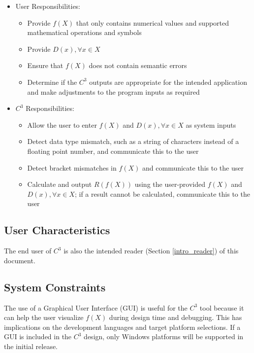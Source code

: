 \documentclass[12pt]{article}
\newcommand{\prognameAbbrv}{$C^{3}$}
\begin{document}
\begin{itemize}
	\item User Responsibilities:
	\begin{itemize}
		\item Provide $f(X)$ that only contains numerical values and supported 
		mathematical operations and symbols
		\item Provide $D(x), \forall x\in X$
		\item Ensure that $f(X)$ does not contain semantic errors
		\item Determine if the \prognameAbbrv{} outputs are appropriate for 
		the intended application and make adjustments to the program inputs as 
		required
	\end{itemize}
	\newpage
	\item \prognameAbbrv{} Responsibilities:
	\begin{itemize}
		\item Allow the user to enter $f(X)$ and $D(x), \forall x\in X$	as 
		system inputs
		\item Detect data type mismatch, such as a string of characters instead 
		of a floating point number, and communicate this to the user
		\item Detect bracket mismatches in $f(X)$ and communicate this to the 
		user
		\item Calculate and output $R(f(X))$ using the user-provided $f(X)$ and 
		$D(x), \forall x\in X$; if a result cannot be calculated, communicate 
		this to the user
	\end{itemize}
\end{itemize}

\subsection{User Characteristics} \label{SecUserCharacteristics}
The end user of \prognameAbbrv{} is also the intended reader (Section 
\ref{intro_reader}) of this document.

\subsection{System Constraints}
\label{sec_sysconstraints}
The use of a Graphical User Interface (GUI) is useful for the \prognameAbbrv{} 
tool because it can help the user visualize $f(X)$ during design time and 
debugging. This has implications on the development languages and target 
platform selections. If a GUI is included in the \prognameAbbrv{} design, only 
Windows platforms will be supported in the initial release.
\end{document}
